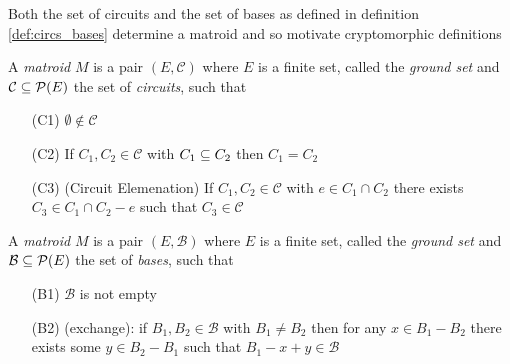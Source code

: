 Both the set of circuits and the set of bases as defined in definition \ref{def:circs_bases} determine a matroid\iftoggle{full}{ which we will see in theorems \ref{thm:equiv_matroid_I_C} and \ref{thm:equiv_matroid_I_B}}{} and so motivate cryptomorphic definitions

\begin{Definition}
\label{def:matroid_C}
    A \textit{matroid} $M$ is a pair $(E,\mathcal{C})$ where $E$ is a finite set, called the \textit{ground set} and $\mathcal{C}\subseteq \mathcal{P}(E)$ the set of \textit{circuits}, such that
    \begin{itemize}
        \item[(C1)] $\emptyset\not\in\mathcal{C}$
        \item[(C2)] If $C_1,C_2\in \mathcal{C}$ with $C_1\subseteq C_2$ then $C_1=C_2$
        \item[(C3)] (Circuit Elemenation) If $C_1,C_2\in \mathcal{C}$ with $e\in C_1\cap C_2$ there exists $C_3\in C_1\cap C_2-e$ such that $C_3\in\mathcal{C}$
    \end{itemize}
\end{Definition}
\begin{Definition}
\label{def:matroid_B}
    A \textit{matroid} $M$ is a pair $(E,\mathcal{B})$ where $E$ is a finite set, called the \textit{ground set} and $\mathcal{B}\subseteq \mathcal{P}(E)$ the set of \textit{bases}, such that
    \begin{itemize}
        \item[(B1)] $\mathcal{B}$ is not empty
        \item[(B2)] (exchange): if $B_1,B_2\in\mathcal{B}$ with $B_1\neq B_2$ then for any $x\in B_1-B_2$ there exists some $y\in B_2-B_1$ such that $B_1-x+y\in\mathcal{B}$
    \end{itemize}
\end{Definition}

